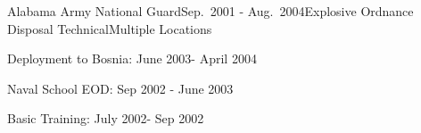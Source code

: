




\begin{rSubsection}{Alabama Army National Guard}{Sep.\ 2001 - Aug.\ 2004}{Explosive Ordnance Disposal Technical}{Multiple Locations}
\item Deployment to Bosnia: June 2003- April 2004
\item Naval School EOD: Sep 2002 - June 2003
\item Basic Training: July 2002- Sep 2002 
\end{rSubsection}
